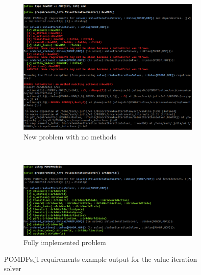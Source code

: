 \begin{figure}[htpb]
    \centering
    \begin{subfigure}[b]{\textwidth}
    \begin{center}
        \includegraphics[width=\textwidth]{media/requirements_info_new.png}
    \end{center}
    \caption{New problem with no methods}
    \end{subfigure} \\
    \begin{subfigure}[b]{\textwidth}
    \begin{center}
        \includegraphics[width=\textwidth]{media/requirements_info_gw.png}
    \end{center}
    \caption{Fully implemented problem}
    \end{subfigure}
     
    \caption[POMDPs.jl requirements example]{POMDPs.jl requirements example output for the value iteration solver}
    \label{fig:requirements}
\end{figure}



